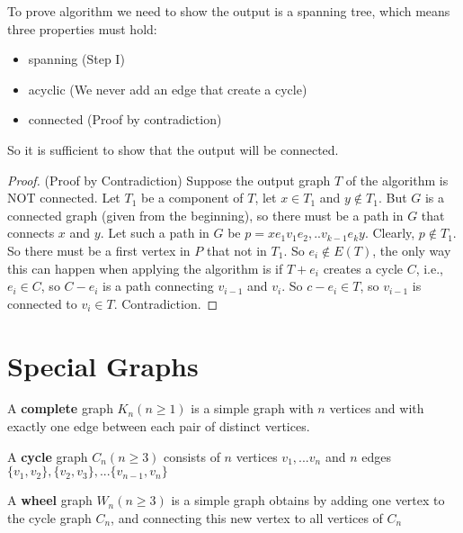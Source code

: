 
			To prove algorithm we need to show the output is a spanning tree, which means three properties must hold:
			\begin{itemize}
				\item spanning (Step I)
				\item acyclic (We never add an edge that create a cycle)
				\item connected (Proof by contradiction)
			\end{itemize}
			So it is sufficient to show that the output will be connected.
			\begin{proof}
				(Proof by Contradiction) Suppose the output graph $T$ of the algorithm is NOT connected. Let $T_1$ be a component of $T$, let $x\in T_1$ and $y \notin T_1$. But $G$ is a connected graph (given from the beginning), so there must be a path in $G$ that connects $x$ and $y$. Let such a path in $G$ be $p=xe_1v_1e_2,..v_{k-1}e_ky$. Clearly, $p\notin T_1$. So there must be a first vertex in $P$ that not in $T_1$. So $e_i \notin E(T)$, the only way this can happen when applying the algorithm is if $T + e_i$ creates a cycle $C$, i.e., $e_i \in C$, so $C - e_i$ is a path connecting $v_{i-1}$ and $v_i$. So $c - e_i \in T$, so $v_{i-1}$ is connected to $v_i \in T$. Contradiction. 
			\end{proof}

		\section{Special Graphs}
			\begin{definition}
				A \textbf{complete} graph $K_n (n \ge 1)$ is a simple graph with $n$ vertices and with exactly one edge between each pair of distinct vertices.
			\end{definition}

			\begin{definition}
				A \textbf{cycle} graph $C_n (n \ge 3)$ consists of $n$ vertices $v_1, ... v_n$ and $n$ edges $\{v_1, v_2\}, \{v_2, v_3\}, ... \{v_{n-1}, v_n\}$
			\end{definition}

			\begin{definition}
				A \textbf{wheel} graph $W_n (n \ge 3)$ is a simple graph obtains by adding one vertex to the cycle graph $C_n$, and connecting this new vertex to all vertices of $C_n$ 
			\end{definition}

